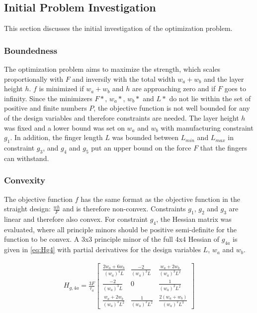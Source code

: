\subsection{Initial Problem Investigation}
This section discusses the initial investigation of the optimization problem. 

\subsubsection{Boundedness}
The optimization problem aims to maximize the strength, which scales proportionally with $F$ and inversily with the total width $w_a + w_b$ and the layer height $h$.  $f$ is minimized if $w_a + w_b$ and $h$ are approaching zero and if $F$ goes to infinity. 
Since the minimizers $F*$, $w_a*$, $w_b*$ and $L*$ do not lie within the set of positive and finite numbers $P$, the objective function is not well bounded for any of the design variables and therefore constraints are needed. 
The layer height $h$ was fixed and a lower bound was set on $w_a$ and $w_b$ with manufacturing constraint $g_1$. 
In addition, the finger length $L$ was bounded between $L_{min}$ and $L_{max}$ in constraint $g_3$, and $g_4$ and $g_5$ put an upper bound on the force $F$ that the fingers can withstand. 

\subsubsection{Convexity}
The objective function $f$ has the same format as the objective function in the straight design: $\frac{w  h}{F}$ and is therefore non-convex.
Constraints $g_1$, $g_2$ and $g_3$ are linear and therefore also convex. 
For constraint $g_4$, the Hessian matrix was evaluated, where all principle minors should be positive semi-definite for the function to be convex. 
A 3x3 principle minor of the full 4x4 Hessian of $g_{4a}$ is given in \cref{eq:Hg4} with partial derivatives for the design variables $L$, $w_a$ and $w_b$.

\begin{align}
	\label{eq:Hg4}
	H_{g,4a}= \frac{3F}{\tau_a}\begin{bmatrix}
		\frac{2w_a + 6 w_b}{\left( w_a \right)^4 L} & \frac{-2}{\left( w_a \right)^3 L } &  \frac{w_a + 2 w_b}{\left( w_a \right)^3 L^2 }\\
		\frac{-2}{\left( w_a \right)^3 L } & 0 & \frac{1}{\left( w_a \right)^2 L^2 }  \\
		\frac{w_a + 2 w_b}{\left( w_a \right)^3 L^2 } & \frac{1}{\left( w_a \right)^2 L^2 } & \frac{2 \left(w_a + w_b\right)}{\left( w_a \right)^2 L^3}													
	\end{bmatrix}
\end{align}

